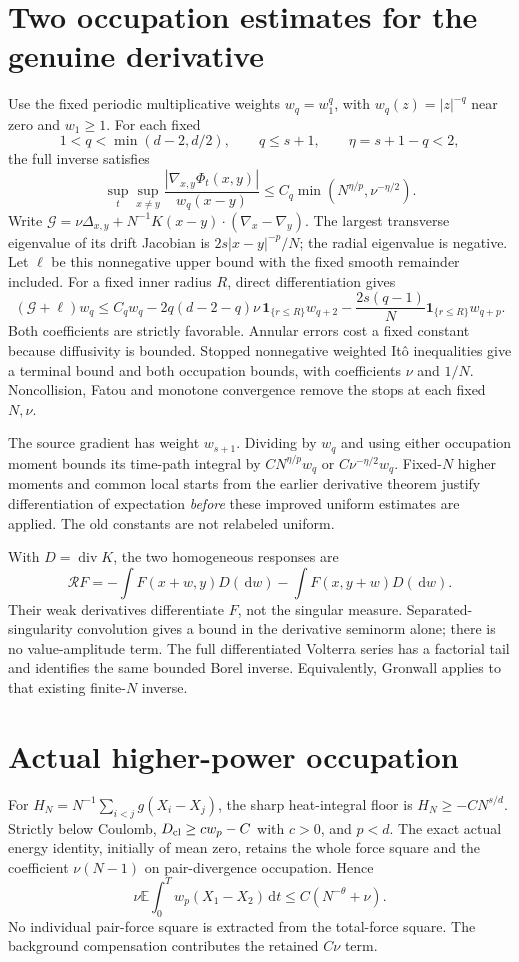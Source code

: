 \documentclass[10pt]{article}
\newcommand{\E}{\mathbb E}
\newcommand{\dd}{\,\mathrm d}
\begin{document}
\section*{Two occupation estimates for the genuine derivative}
Use the fixed periodic multiplicative weights $w_q=w_1^q$, with
$w_q(z)=|z|^{-q}$ near zero and $w_1\ge1$. For each fixed
\[
 1<q<\min(d-2,d/2),\qquad q\le s+1,\qquad\eta=s+1-q<2,
\]
the full inverse satisfies
\[
 \sup_t\sup_{x\ne y}\frac{|\nabla_{x,y}\Phi_t(x,y)|}{w_q(x-y)}
 \le C_q\min(N^{\eta/p},\nu^{-\eta/2}).
\]
Write $\mathcal G=\nu\Delta_{x,y}+N^{-1}K(x-y)\cdot(\nabla_x-\nabla_y)$.
The largest transverse eigenvalue of its drift Jacobian is
$2s|x-y|^{-p}/N$; the radial eigenvalue is negative. Let $\ell$ be this
nonnegative upper bound with the fixed smooth remainder included.
For a fixed inner radius $R$, direct differentiation gives
\[
 (\mathcal G+\ell)w_q\le C_qw_q
 -2q(d-2-q)\nu\,\mathbf1_{\{r\le R\}}w_{q+2}
 -\frac{2s(q-1)}N\mathbf1_{\{r\le R\}}w_{q+p}.
\]
Both coefficients are strictly favorable. Annular errors cost a fixed
constant because diffusivity is bounded. Stopped nonnegative weighted
It\^o inequalities give a terminal bound and both occupation bounds, with
coefficients $\nu$ and $1/N$. Noncollision, Fatou and monotone convergence
remove the stops at each fixed $N,\nu$.

The source gradient has weight $w_{s+1}$. Dividing by $w_q$ and using either
occupation moment bounds its time-path integral by $CN^{\eta/p}w_q$ or
$C\nu^{-\eta/2}w_q$. Fixed-$N$ higher moments and common local starts from
the earlier derivative theorem justify differentiation of expectation
\emph{before} these improved uniform estimates are applied. The old
constants are not relabeled uniform.

With $D=\operatorname{div}K$, the two homogeneous responses are
\[
 \mathcal RF=-\int F(x+w,y)D(\dd w)-\int F(x,y+w)D(\dd w).
\]
Their weak derivatives differentiate $F$, not the singular measure.
Separated-singularity convolution gives a bound in the derivative seminorm
alone; there is no value-amplitude term. The full differentiated Volterra
series has a factorial tail and identifies the same bounded Borel inverse.
Equivalently, Gronwall applies to that existing finite-$N$ inverse.

\section*{Actual higher-power occupation}
For $H_N=N^{-1}\sum_{i<j}g(X_i-X_j)$, the sharp heat-integral floor is
$H_N\ge-CN^{s/d}$. Strictly below Coulomb,
$D_{\rm cl}\ge c w_p-C$ with $c>0$, and $p<d$. The exact actual energy
identity, initially of mean zero, retains the whole force square and the
coefficient $\nu(N-1)$ on pair-divergence occupation. Hence
\[
 \nu\E\int_0^T w_p(X_1-X_2)\dd t\le C(N^{-\theta}+\nu).
\]
No individual pair-force square is extracted from the total-force square.
The background compensation contributes the retained $C\nu$ term.
\end{document}
